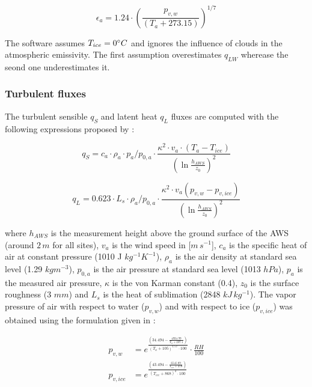 \documentclass[utf8]{frontiersSCNS}
\begin{document}
\begin{equation}
	\epsilon_a=1.24 \cdot (\frac{p_{v,w}}{(T_a+273.15)})^{1/7} \label{eqn:atm_e}
\end{equation}

The software assumes $T_{ice} = 0 \degree C$ and ignores the influence of clouds in the atmospheric emissivity.
The first assumption overestimates $q_{LW}$ wherease the seond one underestimates it.  

\subsubsection{Turbulent fluxes} \label{sec:Qs}

The turbulent sensible $q_{S}$ and latent heat $q_{L}$ fluxes are computed with the following expressions
proposed by \cite{Garratt_1992}:

\begin{equation}
	q_{S}= c_{a} \cdot \rho_{a} \cdot p_{a}/p_{0,a} \cdot \frac{\kappa^2 \cdot v_a \cdot
		(T_a-T_{ice})}{{(\ln{\frac{h_{AWS}}{z_{0}}})}^2}
	\label{eqn:qs}
\end{equation}

\begin{equation}
	q_{L}= 0.623 \cdot L_s \cdot \rho_{a}/p_{0,a} \cdot \frac{\kappa^2 \cdot
	v_a(p_{v,w}-p_{v,ice})}{{(\ln{\frac{h_{AWS}}{z_{0}}})}^2}
\end{equation}

where $h_{AWS}$ is the measurement height above the ground surface of the AWS (around $2\,m$ for all sites),
$v_a$ is the wind speed in [$m\,s^{-1}$], $c_a$ is the specific heat of air at constant pressure (1010 J
$kg^{-1} K^{-1}$), $\rho_{a}$ is the air density at standard sea level (1.29 $kg m^{-3}$), $p_{0,a}$ is the air
pressure at standard sea level (1013 $hPa$), $p_{a}$ is the measured air pressure, $\kappa$ is the von Karman constant (0.4), $z_{0}$ is the surface
roughness (3 $mm$) and $L_s$ is the heat of sublimation (2848 $kJ\,kg^{-1}$).  The vapor pressure of air with
respect to water ($p_{v,w}$) and with respect to ice ($p_{v,ice}$) was obtained using the formulation given in
\cite{huang_2018} :

\begin{equation}
	\begin{split}
		p_{v,w}&=e^{\frac{(34.494 - \frac{4924.99}{T_{a} + 237.1})}{(T_a + 105)^{1.57} \cdot 100}} \cdot \frac{RH}{100} \\
		p_{v,ice}&=e^{\frac{(43.494 - \frac{6545.89}{T_{ice} + 278})}{(T_{ice} + 868)^{2} \cdot 100}} \\
	\end{split} \label{eqn:vp}
\end{equation}
\end{document}
